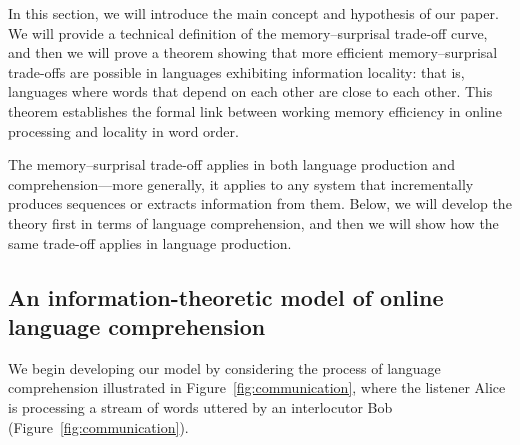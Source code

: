 In this section, we will introduce the main concept and hypothesis of our paper. %
We will provide a technical definition of the memory--surprisal trade-off curve, and then we will prove a theorem showing that more efficient memory--surprisal trade-offs are possible in languages exhibiting information locality: that is, languages where words that depend on each other are close to each other. This theorem establishes the formal link between working memory efficiency in online processing and locality in word order.

The memory--surprisal trade-off applies in both language production and comprehension---more generally, it applies to any system that incrementally produces sequences or extracts information from them. Below, we will develop the theory first in terms of language comprehension, and then we will show how the same trade-off applies in language production.

\subsection{An information-theoretic model of online language comprehension}
\label{sec:listener-tradeoff}


We begin developing our model by considering the process of language comprehension illustrated in Figure~\ref{fig:communication}, where the listener Alice is processing a stream of words uttered by an interlocutor Bob (Figure~\ref{fig:communication}). 

